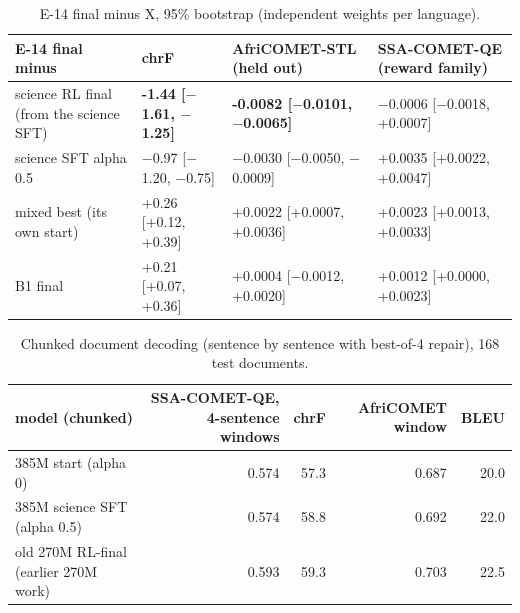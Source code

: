 \begin{table}[t]
\centering\footnotesize
\setlength{\tabcolsep}{4pt}
\caption{E-14 final minus X, 95\% bootstrap (independent weights per language).}\label{tab:e14b}
\begin{tabularx}{\linewidth}{@{}>{\raggedright\arraybackslash}Xll>{\raggedright\arraybackslash}X@{}}
\toprule
E-14 final minus & chrF & AfriCOMET-STL (held out) & SSA-COMET-QE (reward family) \\
\midrule
science RL final (from the science SFT) & \textbf{-1.44 [\ensuremath{-}1.61, \ensuremath{-}1.25]} & \textbf{-0.0082 [\ensuremath{-}0.0101, \ensuremath{-}0.0065]} & \ensuremath{-}0.0006 [\ensuremath{-}0.0018, +0.0007] \\
science SFT alpha 0.5 & \ensuremath{-}0.97 [\ensuremath{-}1.20, \ensuremath{-}0.75] & \ensuremath{-}0.0030 [\ensuremath{-}0.0050, \ensuremath{-}0.0009] & +0.0035 [+0.0022, +0.0047] \\
mixed best (its own start) & +0.26 [+0.12, +0.39] & +0.0022 [+0.0007, +0.0036] & +0.0023 [+0.0013, +0.0033] \\
B1 final & +0.21 [+0.07, +0.36] & +0.0004 [\ensuremath{-}0.0012, +0.0020] & +0.0012 [+0.0000, +0.0023] \\
\bottomrule
\end{tabularx}
\end{table}

\begin{table}[t]
\centering\footnotesize
\setlength{\tabcolsep}{4pt}
\caption{Chunked document decoding (sentence by sentence with best-of-4 repair), 168 test documents.}\label{tab:docs}
\begin{tabularx}{\linewidth}{@{}>{\raggedright\arraybackslash}Xrrrr@{}}
\toprule
model (chunked) & SSA-COMET-QE, 4-sentence windows & chrF & AfriCOMET window & BLEU \\
\midrule
385M start (alpha 0) & 0.574 & 57.3 & 0.687 & 20.0 \\
385M science SFT (alpha 0.5) & 0.574 & 58.8 & 0.692 & 22.0 \\
old 270M RL-final (earlier 270M work) & 0.593 & 59.3 & 0.703 & 22.5 \\
\bottomrule
\end{tabularx}
\end{table}

